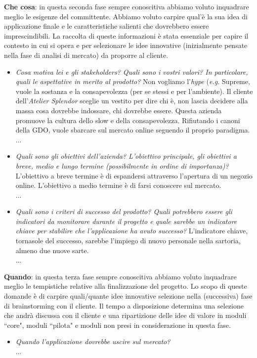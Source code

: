 \documentclass[12pt]{article}
\begin{document}
\textbf{Che cosa}: in questa seconda fase sempre conoscitiva abbiamo voluto inquadrare meglio le esigenze del committente. Abbiamo voluto carpire qual'è la sua idea di applicazione finale e le caratteristiche salienti che dovrebbero essere imprescindibili. La raccolta di queste informazioni è stata essenziale per capire il contesto in cui si opera e per selezionare le idee innovative (inizialmente pensate nella fase di analisi di mercato) da proporre al cliente.
\begin{itemize}
    \item {\em Cosa motiva lei e gli stakeholders? Quali sono i vostri valori? In particolare, quali le aspettative in merito al prodotto?} Non vogliamo l’{\em hype} ({\em e.g.} Supreme, vuole la sostanza e la consapevolezza (per se stessi e per l'ambiente). Il cliente dell'{\em Atelier Splendor} sceglie un vestito per dire chi è, non lascia decidere alla massa cosa dovrebbe indossare, chi dovrebbe essere. Questa azienda promuove la cultura dello slow e della consapevolezza. Rifiutando i canoni della GDO, vuole sbarcare sul mercato online seguendo il proprio paradigma.
    \\
    ...
    \item {\em Quali sono gli obiettivi dell’azienda? L’obiettivo principale, gli obiettivi a breve, medio e lungo termine (possibilmente in ordine di importanza)?} L'obiettivo a breve termine è di espandersi attraverso l'apertura di un negozio online. L'obiettivo a medio termine è di farsi conoscere sul mercato.
    \\
    ...
    \item {\em Quali sono i criteri di successo del prodotto? Quali potrebbero essere gli indicatori da monitorare durante il progetto e quale sarebbe un indicatore chiave per stabilire che l'applicazione ha avuto successo?} L'indicatore chiave, tornasole del successo, sarebbe l'impiego di nuovo personale nella sartoria, almeno due nuove sarte.
    \\
    ...
\end{itemize}

\textbf{Quando}: in questa terza fase sempre conoscitiva abbiamo voluto inquadrare meglio le tempistiche relative alla finalizzazione del progetto. Lo scopo di queste domande è di carpire quali/quante idee innovative selezione nella (successiva) fase di brainstorming con il cliente. Il tempo a disposizione determina una selezione che andrà discussa con il cliente e una ripartizione delle idee di valore in moduli ``core", moduli ``pilota" e moduli non presi in considerazione in questa fase.
\begin{itemize}
    \item {\em Quando l'applicazione dovrebbe uscire sul mercato?}
    \\
    ...
\end{itemize}
\end{document}

